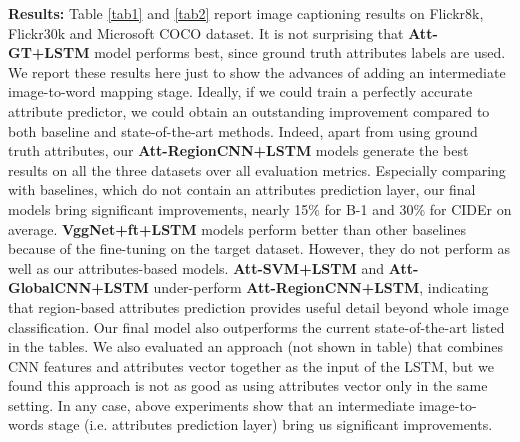 \documentclass[10pt,journal,compsoc]{IEEEtran}
\begin{document}
\vspace{3pt}
\noindent\textbf{Results:} Table \ref{tab1} and \ref{tab2} report image captioning results on Flickr8k, Flickr30k and Microsoft COCO dataset. It is not surprising that \textbf{Att-GT+LSTM} model performs best, since ground truth attributes labels are used. We report these results here just to show the advances of adding an intermediate image-to-word mapping stage. Ideally, if we could train a perfectly accurate attribute predictor, we could obtain an outstanding improvement compared to both baseline and state-of-the-art methods. Indeed, apart from using ground truth attributes, our \textbf{Att-RegionCNN+LSTM} models generate the best results on all the three datasets over all evaluation metrics. Especially comparing with baselines, which do not contain an attributes prediction layer, our final models bring significant improvements, nearly 15\% for B-1 and 30\% for CIDEr on average. \textbf{VggNet+ft+LSTM} models perform better than other baselines because of the fine-tuning on the target dataset. However, they do not perform as well as our attributes-based models. \textbf{Att-SVM+LSTM} and \textbf{Att-GlobalCNN+LSTM} under-perform \textbf{Att-RegionCNN+LSTM}, indicating that region-based attributes prediction provides useful detail beyond whole image classification. Our final model also outperforms the current state-of-the-art listed in the tables. We also evaluated an approach (not shown in table) that combines CNN features and attributes vector together as the input of the LSTM, but we found this approach is not as good as using attributes vector only in the same setting.  In any case, above experiments show that an intermediate image-to-words stage (i.e. attributes prediction layer) bring us significant improvements.
\end{document}

